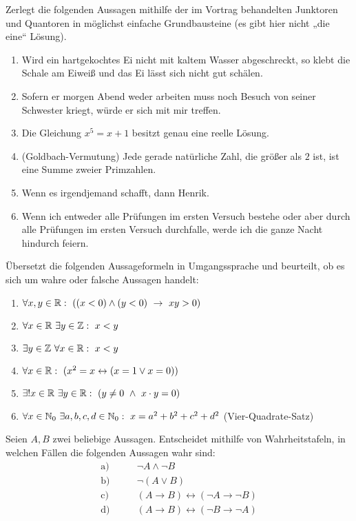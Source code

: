 \begin{aufg}
    Zerlegt die folgenden Aussagen mithilfe der im Vortrag behandelten Junktoren und Quantoren in möglichst einfache Grundbausteine (es gibt hier nicht „die eine“ Lösung).
    \begin{enumerate}
        \item Wird ein hartgekochtes Ei nicht mit kaltem Wasser abgeschreckt, so klebt die Schale am Eiweiß und das Ei lässt sich nicht gut schälen.
        \item Sofern er morgen Abend weder arbeiten muss noch Besuch von seiner Schwester kriegt, würde er sich mit mir treffen.
        \item Die Gleichung $x^5=x+1$ besitzt genau eine reelle Lösung.
        \item(Goldbach-Vermutung) Jede gerade natürliche Zahl, die größer als $2$ ist, ist eine Summe zweier Primzahlen.
        \item Wenn es irgendjemand schafft, dann Henrik.
        \item Wenn ich entweder alle Prüfungen im ersten Versuch bestehe oder aber durch alle Prüfungen im ersten Versuch durchfalle, werde ich die ganze Nacht hindurch feiern.
    \end{enumerate}
\end{aufg}


\begin{aufg}
    Übersetzt die folgenden Aussageformeln in Umgangssprache und beurteilt, ob es sich um wahre oder falsche Aussagen handelt:
    \begin{enumerate}
        \item $\forall x,y\in \mathbb R:\ ((x<0)\land (y<0)\ \to\ xy>0)$
        \item $\forall x\in \R\ \exists y\in \Z:\ x<y$
        \item $\exists y\in \Z\ \forall x\in \R:\ x<y$
        \item $\forall x\in \mathbb R:\ (x^2 =x\leftrightarrow(x=1\vee x=0))$
        \item $\exists! x\in \R\ \exists y\in \R:\ (y\neq0\ \land\ x\cdot y=0)$
        \item $\forall x\in\mathbb N_0\ \exists a,b,c,d\in \mathbb N_0:\ x=a^2+b^2+c^2+d^2$ \quad (Vier-Quadrate-Satz)
    \end{enumerate}
\end{aufg}
	
	
\begin{aufg}[Wahrheitstafeln]
    Seien $A,B$ zwei beliebige Aussagen. Entscheidet mithilfe von Wahrheitstafeln, in welchen Fällen die folgenden Aussagen wahr sind:
    \begin{align*}
        \text{a)}&\qquad \neg A \land \neg B \\
        \text{b)}&\qquad \neg(A\lor B) \\
        \text{c)}&\qquad (A\to B)\leftrightarrow(\neg A \to \neg B) \\
        \text{d)}&\qquad (A\to B)\leftrightarrow(\neg B \to \neg A)
    \end{align*}
\end{aufg}



